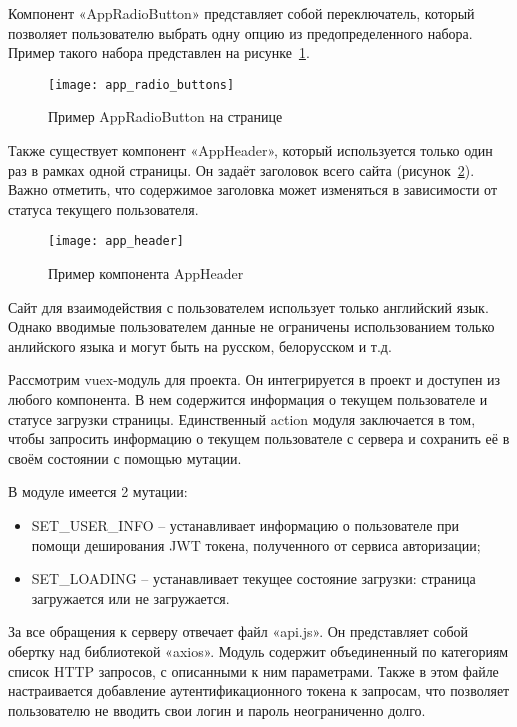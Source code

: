 Компонент «AppRadioButton» представляет собой переключатель, который позволяет пользователю выбрать одну опцию из предопределенного набора. Пример такого набора представлен на рисунке~\ref{fig:app_radio_buttons}.

\begin{figure}[h]
    \centering
    \texttt{[image: app\_radio\_buttons]}
    \caption{Пример AppRadioButton на странице}\label{fig:app_radio_buttons}
\end{figure}

Также существует компонент «AppHeader», который используется только один раз в рамках одной страницы. Он задаёт заголовок всего сайта (рисунок~\ref{fig:app_header}). Важно отметить, что содержимое заголовка может изменяться в зависимости от статуса текущего пользователя.

\begin{figure}[h]
    \centering
    \texttt{[image: app\_header]}
    \caption{Пример компонента AppHeader}\label{fig:app_header}
\end{figure}

Сайт для взаимодействия с пользователем использует только английский язык. Однако вводимые пользователем данные не ограничены использованием только анлийского языка и могут быть на русском, белорусском и т.д.

Рассмотрим vuex-модуль для проекта. Он интегрируется в проект и доступен из любого компонента. В нем содержится информация о текущем пользователе и статусе загрузки страницы. Единственный action модуля заключается в том, чтобы запросить информацию о текущем пользователе с сервера и сохранить её в своём состоянии с помощью мутации.

В модуле имеется 2 мутации:

\begin{itemize}
    \item SET\_USER\_INFO – устанавливает информацию о пользователе при помощи деширования JWT токена, полученного от сервиса авторизации;
    \item SET\_LOADING – устанавливает текущее состояние загрузки: страница загружается или не загружается.
\end{itemize}

За все обращения к серверу отвечает файл «api.js». Он представляет собой обертку над библиотекой «axios». Модуль содержит объединенный по категориям список HTTP запросов, с описанными к ним параметрами. Также в этом файле настраивается добавление аутентификационного токена к запросам, что позволяет пользователю не вводить свои логин и пароль неограниченно долго. 

